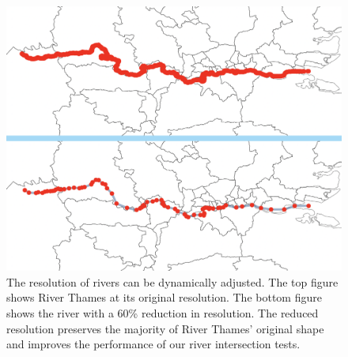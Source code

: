 {
\begin{figure}[tb!]
    \centering
    \includegraphics[width=\columnwidth]{figure/river_resolution.png}
    \caption{The resolution of rivers can be dynamically adjusted. The top figure shows River Thames at its original resolution. The bottom figure shows the river with a 60\% reduction in resolution. The reduced resolution preserves the majority of River Thames' original shape and improves the performance of our river intersection tests.}
    \label{fig:river resolution}
\end{figure}
}

